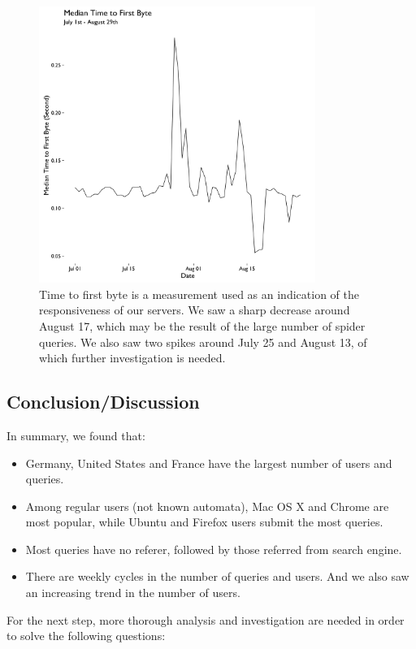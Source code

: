\documentclass[12pt,]{article}
\providecommand{\tightlist}{%
  \setlength{\itemsep}{0pt}\setlength{\parskip}{0pt}}
\begin{document}
\begin{figure}[H]
\centering
\includegraphics[width=9cm,height=9cm,keepaspectratio]{figures/median_time_firstbyte_ts.png}
\caption{Time to first byte is a measurement used as an indication of
the responsiveness of our servers. We saw a sharp decrease around August
17, which may be the result of the large number of spider queries. We
also saw two spikes around July 25 and August 13, of which further
investigation is needed.}
\end{figure}

\newpage

\subsection{Conclusion/Discussion}\label{conclusiondiscussion}

In summary, we found that:

\begin{itemize}
\tightlist
\item
  Germany, United States and France have the largest number of users and
  queries.
\item
  Among regular users (not known automata), Mac OS X and Chrome are most
  popular, while Ubuntu and Firefox users submit the most queries.
\item
  Most queries have no referer, followed by those referred from search
  engine.
\item
  There are weekly cycles in the number of queries and users. And we
  also saw an increasing trend in the number of users.
\end{itemize}

For the next step, more thorough analysis and investigation are needed
in order to solve the following questions:
\end{document}
